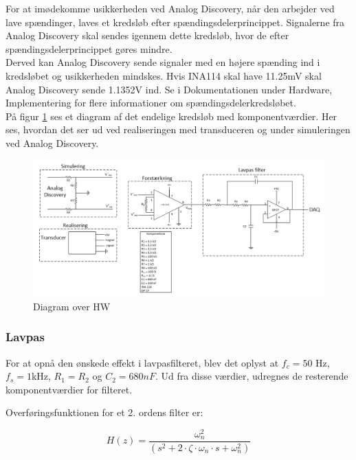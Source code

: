 \newline 
For at imødekomme usikkerheden ved Analog Discovery, når den arbejder ved lave spændinger, laves et kredsløb efter spændingsdelerprincippet. Signalerne fra Analog Discovery skal sendes igennem dette kredsløb, hvor de efter spændingsdelerprincippet gøres mindre.\\  
Derved kan Analog Discovery sende signaler med en højere spænding ind i kredsløbet og usikkerheden mindskes. Hvis INA114 skal have 11.25mV skal Analog Discovery sende 1.1352V ind. Se i Dokumentationen under Hardware, Implementering for flere informationer om spændingsdelerkredsløbet.   
\\
\newline 
På figur \ref{fig:HW} ses et diagram af det endelige kredsløb med komponentværdier. Her ses, hvordan det ser ud ved realiseringen med transduceren og under simuleringen ved Analog Discovery. 
\begin{figure}[H]
	\centering
	\includegraphics[width=1.0\textwidth]{Figurer/diagram_over_HW}
	\caption{Diagram over HW}
	\label{fig:HW}
\end{figure}

\subsubsection{Lavpas}
For at opnå den ønskede effekt i lavpasfilteret, blev det oplyst at $ f_c=50$ Hz, $ f_s = 1$kHz, $ R_1 = R_2 $ og $ C_2=680 nF$. Ud fra disse værdier, udregnes de resterende komponentværdier for filteret.

Overføringsfunktionen for et 2. ordens filter er:
\begin{ceqn} 
\begin{equation}
H(z)=\frac{\omega_n^2}{(s^2 + 2\cdot\zeta \cdot \omega_n \cdot s+\omega_n^2)}
\end{equation}
\end{ceqn}

